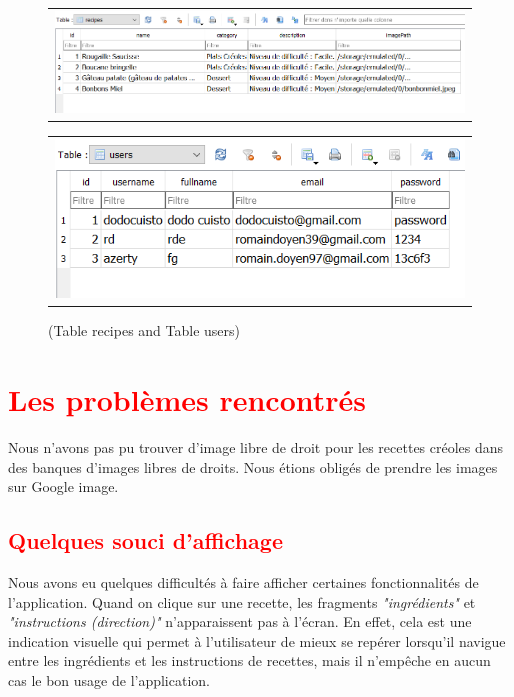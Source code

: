 \documentclass{article}
\begin{document}
\begin{figure}
    \centering
    \begin{tabular}{@{}c@{}}
        \includegraphics[scale=0.8]{recettes.png}
    \end{tabular}
    \begin{tabular}{@{}c@{}}
        \includegraphics[scale=0.8]{users.png}
    \end{tabular}
    \caption{(Table recipes and Table users)}
\end{figure}

\newpage


\section{\textcolor{red}{Les problèmes rencontrés}}

Nous n’avons pas pu trouver d’image libre de droit pour les recettes créoles dans des banques d’images libres de droits. Nous étions obligés de prendre les images sur Google image.\\

\subsection{\textcolor{red}{Quelques souci d’affichage}}

Nous avons eu quelques difficultés à faire afficher certaines fonctionnalités de l’application. Quand on clique sur une recette, les fragments \textit{"ingrédients"} et \textit{"instructions (direction)"} n’apparaissent pas à l’écran. En effet, cela est une indication visuelle qui permet à l’utilisateur de mieux se repérer lorsqu’il navigue entre les ingrédients et les instructions de recettes, mais il n’empêche en aucun cas le bon usage de l’application.\\
\end{document}
